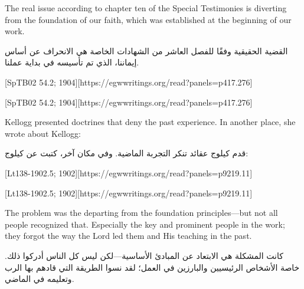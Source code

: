 



The real issue according to chapter ten of the Special Testimonies is diverting from the foundation of our faith, which was established at the beginning of our work.


القضية الحقيقية وفقًا للفصل العاشر من الشهادات الخاصة هي الانحراف عن أساس إيماننا، الذي تم تأسيسه في بداية عملنا.


[SpTB02 54.2; 1904][https://egwwritings.org/read?panels=p417.276]


[SpTB02 54.2; 1904][https://egwwritings.org/read?panels=p417.276]


Kellogg presented doctrines that deny the past experience. In another place, she wrote about Kellogg:


قدم كيلوج عقائد تنكر التجربة الماضية. وفي مكان آخر، كتبت عن كيلوج:


[Lt138-1902.5; 1902][https://egwwritings.org/read?panels=p9219.11]


[Lt138-1902.5; 1902][https://egwwritings.org/read?panels=p9219.11]


The problem was the departing from the foundation principles—but not all people recognized that. Especially the key and prominent people in the work; they forgot the way the Lord led them and His teaching in the past.


كانت المشكلة هي الابتعاد عن المبادئ الأساسية—لكن ليس كل الناس أدركوا ذلك. خاصة الأشخاص الرئيسيين والبارزين في العمل؛ لقد نسوا الطريقة التي قادهم بها الرب وتعليمه في الماضي.


